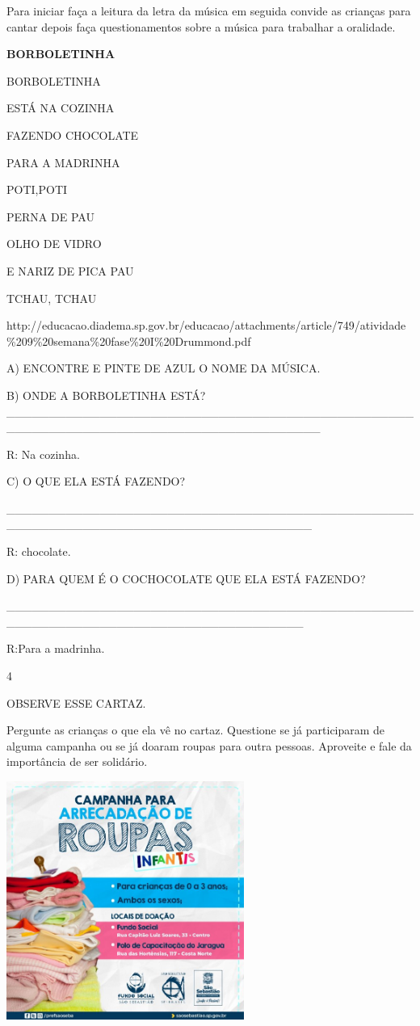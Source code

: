 {{{Para iniciar faça a leitura da letra da música em seguida convide as
crianças para cantar depois faça questionamentos sobre a música para
trabalhar a oralidade.

\textbf{BORBOLETINHA}

BORBOLETINHA

ESTÁ NA COZINHA

FAZENDO CHOCOLATE

PARA A MADRINHA

POTI,POTI

PERNA DE PAU

OLHO DE VIDRO

E NARIZ DE PICA PAU

TCHAU, TCHAU

\protect\hypertarget{_Hlk128661930}{}{}http://educacao.diadema.sp.gov.br/educacao/attachments/article/749/atividade\%209\%20semana\%20fase\%20I\%20Drummond.pdf

A) ENCONTRE E PINTE DE AZUL O NOME DA MÚSICA.

B) ONDE A BORBOLETINHA ESTÁ?
\_\_\_\_\_\_\_\_\_\_\_\_\_\_\_\_\_\_\_\_\_\_\_\_\_\_\_\_\_\_\_\_\_\_\_\_\_\_\_\_\_\_\_\_\_\_\_\_\_\_\_\_\_\_\_\_\_\_\_\_\_\_\_\_\_\_\_\_\_\_\_\_\_\_\_\_\_\_\_\_\_\_\_\_\_

R: Na cozinha.

C) O QUE ELA ESTÁ FAZENDO?

\_\_\_\_\_\_\_\_\_\_\_\_\_\_\_\_\_\_\_\_\_\_\_\_\_\_\_\_\_\_\_\_\_\_\_\_\_\_\_\_\_\_\_\_\_\_\_\_\_\_\_\_\_\_\_\_\_\_\_\_\_\_\_\_\_\_\_\_\_\_\_\_\_\_\_\_\_\_\_\_\_\_\_\_

R: chocolate.

D) PARA QUEM É O COCHOCOLATE QUE ELA ESTÁ FAZENDO?

\_\_\_\_\_\_\_\_\_\_\_\_\_\_\_\_\_\_\_\_\_\_\_\_\_\_\_\_\_\_\_\_\_\_\_\_\_\_\_\_\_\_\_\_\_\_\_\_\_\_\_\_\_\_\_\_\_\_\_\_\_\_\_\_\_\_\_\_\_\_\_\_\_\_\_\_\_\_\_\_\_\_\_

R:Para a madrinha.

\num{4}

OBSERVE ESSE CARTAZ.

Pergunte as crianças o que ela vê no cartaz. Questione se já
participaram de alguma campanha ou se já doaram roupas para outra
pessoas. Aproveite e fale da importância de ser solidário.

\includegraphics[width=3.06414in,height=3.07006in]{media/image83.jpeg}

}}}
